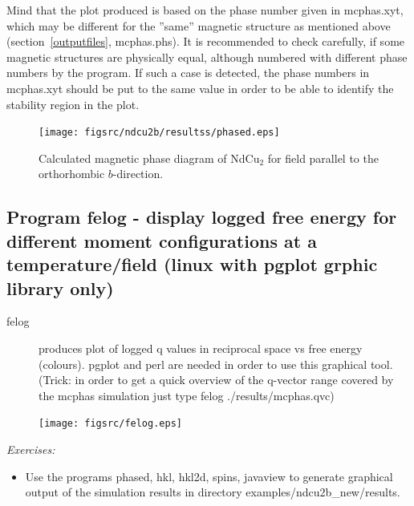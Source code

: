 Mind that the plot produced is based on the phase number given in {\prg mcphas.xyt}, which may be
different for the ''same'' magnetic structure as mentioned above
(section~\ref{outputfiles}, {\prg mcphas.phs}). It is recommended to check carefully, if
some magnetic structures are physically equal, although numbered with different phase numbers by
the program. If such a case is detected, the phase numbers in {\prg mcphas.xyt} should
be put to the same value in order to be able to identify the stability region in the plot.

\begin{figure}[hb]%
\begin{center}\leavevmode
\texttt{[image: figsrc/ndcu2b/resultss/phased.eps]}
\end{center}
\caption{Calculated magnetic phase diagram of NdCu$_2$ for field parallel to the orthorhombic $b$-direction.}
\label{phasediagramgraphic}
\end{figure}
\clearpage


\subsection{Program {\prg felog} - display logged free energy for different moment configurations %
at a temperature/field (linux with pgplot grphic library only)}

\begin{description} 
\item [felog]                  produces plot of logged q values in reciprocal
space vs free energy (colours). {\prg pgplot} and {\prg perl} are needed in order
to use this graphical tool.
(Trick: in order to get a quick overview of the
q-vector range covered by the mcphas simulation just type {\prg felog ./results/mcphas.qvc})
\end{description} 

\begin{figure}[hb]%
\begin{center}\leavevmode
\texttt{[image: figsrc/felog.eps]}
\end{center}
\end{figure}

\vspace{1cm}
{\em Exercises:}
\begin{itemize}
\item Use the programs {\prg phased, hkl, hkl2d, spins, javaview} to generate
graphical output of the simulation results in directory 
{\prg examples/ndcu2b\_new/results}.
\end{itemize}


